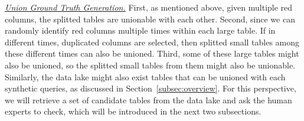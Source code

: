 \noindent \underline{\textit{Union Ground Truth Generation.}}  
First, as mentioned above, given multiple red columns, the splitted tables are unionable with each other.
%
%
Second, since we can randomly identify red columns multiple times within each large table. If in different times, duplicated columns are selected, then  splitted small tables among these different times can also be unioned.
%
%
 Third, some of these large tables might also be unioned, so the splitted small tables from them might also be unionable. Similarly, the data lake might also exist tables that can be unioned with each synthetic queries, as discussed in Section~\ref{subsec:overview}.
 For this perspective, we will retrieve a set of candidate tables from the data lake and ask the human experts to check, which will be introduced in the next two subsections.
 
